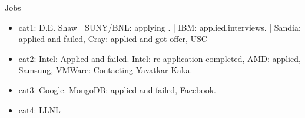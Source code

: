 \documentclass[serif, mathserif, final]{beamer}
\begin{document}
\begin{frame}[label=socialInt]
  \begin{block}{Jobs}
    \begin{itemize}
      \tiny \item \tiny cat1: D.E. Shaw | SUNY/BNL: applying . | IBM: applied,interviews.  | Sandia:
      applied and failed, Cray: applied and got offer, USC
    \item \tiny cat2: Intel: Applied and failed. Intel: re-application
      completed, AMD: applied, Samsung, VMWare: Contacting Yavatkar
      Kaka. 
    \item \tiny cat3: Google. MongoDB: applied and failed, Facebook. 
    \item \tiny cat4: LLNL 
    \end{itemize} 
  \end{block} 



\end{frame}
\end{document}
